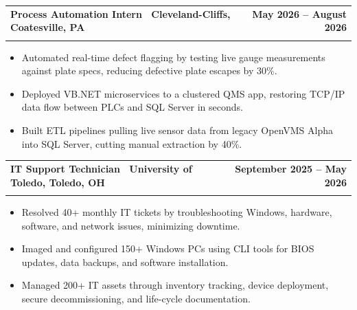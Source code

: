 \documentclass[letterpaper,11pt]{article}
\makeatletter
\newcommand{\resumeItem}[1]{\item\small{#1 \vspace{-4pt}}}
\newcommand{\resumeSubheading}[4]{
    \vspace{-2pt}\item
    \begin{tabular*}{1.0\textwidth}[t]{l@{\extracolsep{\fill}}r}
        \textbf{#1} & \textbf{\small #2} \\
        \textit{\small#3} & \textit{\small #4}
    \end{tabular*}\vspace{-7pt}
}
\newcommand{\resumeItemListStart}{\begin{itemize}}
\newcommand{\resumeItemListEnd}{\end{itemize}\vspace{-7pt}}
\makeatother
\begin{document}
\resumeSubheading
{\textbf{Process Automation Intern} \textnormal{\textbar\ Cleveland-Cliffs, Coatesville, PA}}{May 2026 -- August 2026}
{}{}
\vspace{-0.6cm}
\resumeItemListStart

\resumeItem{Automated real-time defect flagging by testing live gauge measurements against plate specs, reducing defective plate escapes by 30\%.}

\vspace{0.15cm}

\resumeItem{Deployed VB.NET microservices to a clustered QMS app, restoring TCP/IP data flow between PLCs and SQL Server in seconds.}
\vspace{0.15cm}


\resumeItem{Built ETL pipelines pulling live sensor data from legacy OpenVMS Alpha into SQL Server, cutting manual extraction by 40\%.}





\vspace{0.15cm}
\resumeItemListEnd
\resumeSubheading
{\textbf{IT Support Technician} \textnormal{\textbar\ University of Toledo, Toledo, OH}}{September 2025 -- May 2026}
{}{}
\vspace{-0.6cm}
\resumeItemListStart

\resumeItem{Resolved 40+ monthly IT tickets by troubleshooting Windows, hardware, software, and network issues, minimizing downtime.}

\vspace{0.15cm}
\resumeItem{Imaged and configured 150+ Windows PCs using CLI tools for BIOS updates, data backups, and software installation.}

\vspace{0.15cm}
\resumeItem{Managed 200+ IT assets through inventory tracking, device deployment, secure decommissioning, and life-cycle documentation.}

\vspace{0.15cm}

\resumeItemListEnd
\end{document}
